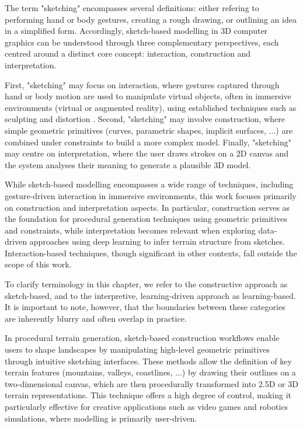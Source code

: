 The term "sketching" encompasses several definitions: either refering to performing hand or body gestures, creating a rough drawing, or outlining an idea in a simplified form. Accordingly, sketch-based modelling in 3D computer graphics can be understood through three complementary perspectives, each centred around a distinct core concept: interaction, construction and interpretation.

First, "sketching" may focus on interaction, where gestures captured through hand or body motion are used to manipulate virtual objects, often in immersive environments (virtual or augmented reality), using established techniques such as sculpting and distortion \cite{Olsen2009, Cook2009}. Second, "sketching" may involve construction, where simple geometric primitives (curves, parametric shapes, implicit surfaces, ...) are combined under constraints to build a more complex model. Finally, "sketching" may centre on interpretation, where the user draws strokes on a 2D canvas and the system analyses their meaning to generate a plausible 3D model.

While sketch-based modelling encompasses a wide range of techniques, including gesture-driven interaction in immersive environments, this work focuses primarily on construction and interpretation aspects. In particular, construction serves as the foundation for procedural generation techniques using geometric primitives and constraints, while interpretation becomes relevant when exploring data-driven approaches using deep learning to infer terrain structure from sketches. Interaction-based techniques, though significant in other contexts, fall outside the scope of this work.

To clarify terminology in this chapter, we refer to the constructive approach as sketch-based, and to the interpretive, learning-driven approach as learning-based. It is important to note, however, that the boundaries between these categories are inherently blurry and often overlap in practice.

In procedural terrain generation, sketch-based construction workflows enable users to shape landscapes by manipulating high-level geometric primitives through intuitive sketching interfaces. These methods allow the definition of key terrain features (mountains, valleys, coastlines, ...) by drawing their outlines on a two-dimensional canvas, which are then procedurally transformed into 2.5D or 3D terrain representations. This technique offers a high degree of control, making it particularly effective for creative applications such as video games and robotics simulations, where modelling is primarily user-driven.

